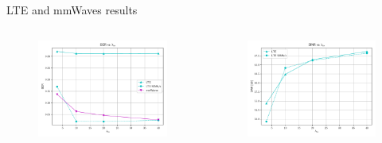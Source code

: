 \documentclass{beamer}
\begin{document}
\begin{frame}{LTE and mmWaves results}
\begin{columns}
\begin{figure}
					\vspace{-0.1in}
					\includegraphics[scale=0.28]{BER_lambda_bs_lte_mmwave_UDP}
				\end{figure}
				\begin{figure}
					\vspace{-0.2in}
					\includegraphics[scale=0.28]{SINR_lambda_bs_lte_mmwave_UDP}
				\end{figure}
		\end{columns}
	\end{frame}
\end{document}
